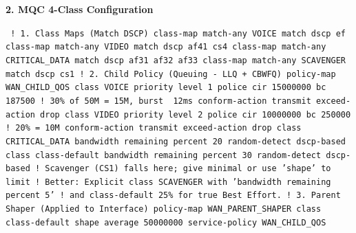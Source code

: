 \documentclass[11pt]{article}
\begin{document}
\begin{exoresolu}
\noindent\textbf{2. MQC 4-Class Configuration}
\begin{flushleft}
\texttt{
! 1. Class Maps (Match DSCP)\newline
class-map match-any VOICE\newline
 match dscp ef\newline
class-map match-any VIDEO\newline
 match dscp af41 cs4\newline
class-map match-any CRITICAL\_DATA\newline
 match dscp af31 af32 af33\newline
class-map match-any SCAVENGER\newline
 match dscp cs1\newline
\newline
! 2. Child Policy (Queuing - LLQ + CBWFQ)\newline
policy-map WAN\_CHILD\_QOS\newline
 class VOICE\newline
  priority level 1\newline
  police cir 15000000 bc 187500  ! 30\% of 50M = 15M, burst ~12ms\newline
  conform-action transmit\newline
  exceed-action drop\newline
 class VIDEO\newline
  priority level 2\newline
  police cir 10000000 bc 250000  ! 20\% = 10M\newline
  conform-action transmit\newline
  exceed-action drop\newline
 class CRITICAL\_DATA\newline
  bandwidth remaining percent 20\newline
  random-detect dscp-based\newline
 class class-default\newline
  bandwidth remaining percent 30\newline
  random-detect dscp-based\newline
  ! Scavenger (CS1) falls here; give minimal or use 'shape' to limit\newline
  ! Better: Explicit class SCAVENGER with 'bandwidth remaining percent 5' \newline
  ! and class-default 25\% for true Best Effort.\newline
\newline
! 3. Parent Shaper (Applied to Interface)\newline
policy-map WAN\_PARENT\_SHAPER\newline
 class class-default\newline
  shape average 50000000\newline
  service-policy WAN\_CHILD\_QOS
}
\end{flushleft}


\end{exoresolu}
\end{document}
